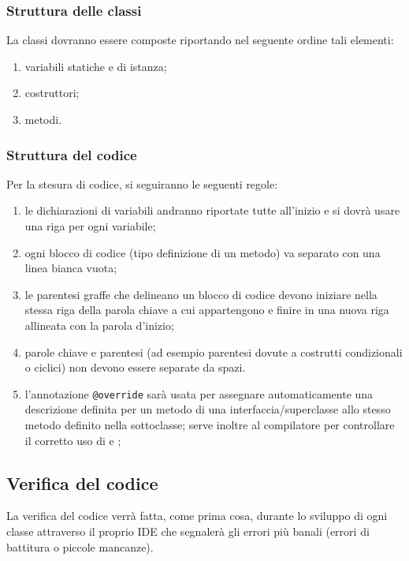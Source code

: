 {\begin{itemize}
\end{itemize}

\subsubsection{Struttura delle classi}
La classi dovranno essere composte riportando nel seguente ordine tali elementi:
\begin{enumerate}
\item variabili statiche e di istanza;
\item costruttori;
\item metodi.
\end{enumerate}

\subsubsection{Struttura del codice}
Per la stesura di codice, si seguiranno le seguenti regole:
\begin{enumerate}
\item le dichiarazioni di variabili andranno riportate tutte all'inizio e si dovrà usare una riga per ogni variabile;
\item ogni blocco di codice (tipo definizione di un metodo) va separato  con una linea bianca vuota;
\item le parentesi graffe che delineano un blocco di codice devono iniziare nella stessa riga della parola chiave a cui appartengono e finire in una nuova riga allineata con la parola d'inizio;
\item parole chiave e parentesi (ad esempio parentesi dovute a costrutti condizionali o ciclici) non devono essere separate da spazi.
\item l'annotazione \verb+@override+ sarà usata per assegnare automaticamente una descrizione definita per un metodo di una interfaccia/superclasse allo stesso metodo definito nella sottoclasse; serve inoltre al compilatore per controllare il corretto uso di  e ;
\end{enumerate}

\subsection{Verifica del codice}
La verifica del codice verrà fatta, come prima cosa, durante lo sviluppo di ogni classe attraverso il proprio IDE che segnalerà gli errori più banali (errori di battitura o piccole mancanze).

}
